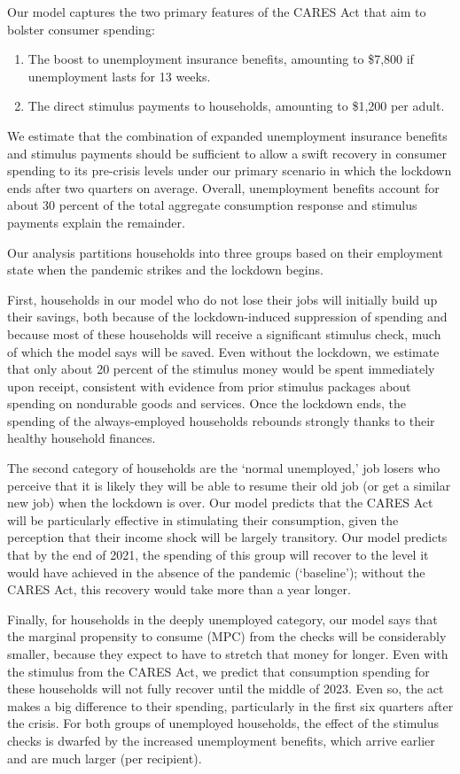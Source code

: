 \documentclass[titlepage]{\econtex}
\begin{document}
Our model captures the two primary features of the CARES Act that aim to bolster consumer spending:
\begin{enumerate}
\item The boost to unemployment insurance benefits, amounting to \$7,800 if unemployment lasts for 13 weeks.
\item The direct stimulus payments to households, amounting to \$1,200 per adult.
\end{enumerate}

We estimate that the combination of expanded unemployment insurance benefits and stimulus payments should be sufficient to allow a swift recovery in consumer spending to its pre-crisis levels under our primary scenario in which the lockdown ends after two quarters on average. 
Overall, unemployment benefits account for about 30 percent of the total aggregate consumption response and stimulus payments explain the remainder.

Our analysis partitions households into three groups based on their employment state when the pandemic strikes and the lockdown begins.

First, households in our model who do not lose their jobs will initially build up their savings, both because of the lockdown-induced suppression of spending and because most of these households will receive a significant stimulus check, much of which the model says will be saved.
Even without the lockdown, we estimate that only about 20 percent of the stimulus money would be spent immediately upon receipt, consistent with evidence from prior stimulus packages about spending on nondurable goods and services.
Once the lockdown ends, the spending of the always-employed households rebounds strongly thanks to their healthy household finances.

The second category of households are the `normal unemployed,' job losers who perceive that it is likely they will be able to resume their old job (or get a similar new job) when the lockdown is over.
Our model predicts that the CARES Act will be particularly effective in stimulating their consumption, given the perception that their income shock will be largely transitory.  Our model predicts that by the end of 2021, the spending of this group will recover to the level it would have achieved in the absence of the pandemic (`baseline'); without the CARES Act, this recovery would take more than a year longer.

Finally, for households in the deeply unemployed category, our model says that the marginal propensity to consume (MPC) from the checks will be considerably smaller, because they expect to have to stretch that money for longer.
Even with the stimulus from the CARES Act, we predict that consumption spending for these households will not fully recover until the middle of 2023.
Even so, the act makes a big difference to their spending, particularly in the first six quarters after the crisis.
For both groups of unemployed households, the effect of the stimulus checks is dwarfed by the increased unemployment benefits, which arrive earlier and are much larger (per recipient).
\end{document}
